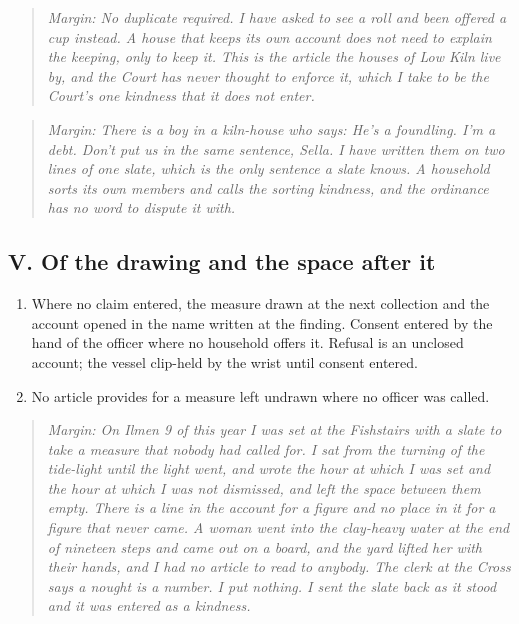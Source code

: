 \documentclass{design/chronicle}
\begin{document}
\begin{quote}\itshape \emph{Margin:} No duplicate required. I have asked to see a roll and been offered a cup instead. A house that keeps its own account does not need to explain the keeping, only to keep it. This is the article the houses of Low Kiln live by, and the Court has never thought to enforce it, which I take to be the Court’s one kindness that it does not enter.\end{quote}

\begin{quote}\itshape \emph{Margin:} There is a boy in a kiln-house who says: \emph{He’s a foundling. I’m a debt. Don’t put us in the same sentence, Sella.} I have written them on two lines of one slate, which is the only sentence a slate knows. A household sorts its own members and calls the sorting kindness, and the ordinance has no word to dispute it with.\end{quote}

\subsection*{V. Of the drawing and the space after it}

\begin{enumerate}[leftmargin=1.4em,itemsep=1pt,topsep=3pt,parsep=0pt]

\item Where no claim entered, the measure drawn at the next collection and the account opened in the name written at the finding. Consent entered by the hand of the officer where no household offers it. Refusal is an unclosed account; the vessel clip-held by the wrist until consent entered.

\item No article provides for a measure left undrawn where no officer was called.

\end{enumerate}

\begin{quote}\itshape \emph{Margin:} On Ilmen 9 of this year I was set at the Fishstairs with a slate to take a measure that nobody had called for. I sat from the turning of the tide-light until the light went, and wrote the hour at which I was set and the hour at which I was not dismissed, and left the space between them empty. There is a line in the account for a figure and no place in it for a figure that never came. A woman went into the clay-heavy water at the end of nineteen steps and came out on a board, and the yard lifted her with their hands, and I had no article to read to anybody. The clerk at the Cross says a nought is a number. I put nothing. I sent the slate back as it stood and it was entered as a kindness.\end{quote}
\end{document}
